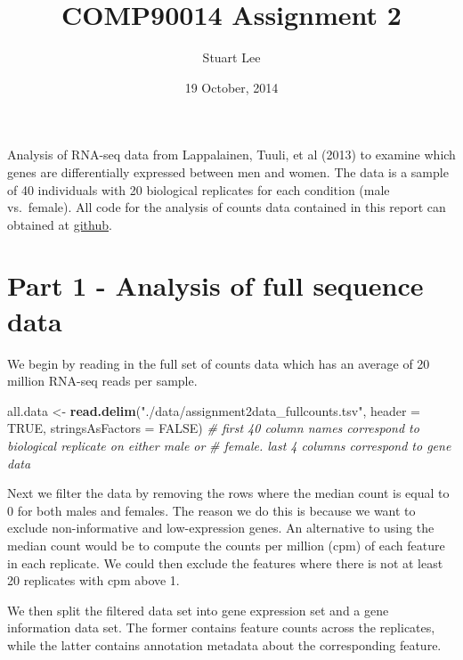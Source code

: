 \documentclass[]{article}
\title{COMP90014 Assignment 2}
\author{Stuart Lee}
\date{19 October, 2014}
\newenvironment{Shaded}{\begin{snugshade}}{\end{snugshade}}
\newcommand{\KeywordTok}[1]{\textcolor[rgb]{0.13,0.29,0.53}{\textbf{{#1}}}}
\newcommand{\DataTypeTok}[1]{\textcolor[rgb]{0.13,0.29,0.53}{{#1}}}
\newcommand{\StringTok}[1]{\textcolor[rgb]{0.31,0.60,0.02}{{#1}}}
\newcommand{\CommentTok}[1]{\textcolor[rgb]{0.56,0.35,0.01}{\textit{{#1}}}}
\newcommand{\OtherTok}[1]{\textcolor[rgb]{0.56,0.35,0.01}{{#1}}}
\newcommand{\NormalTok}[1]{{#1}}
\begin{document}
\maketitle


Analysis of RNA-seq data from Lappalainen, Tuuli, et al (2013) to
examine which genes are differentially expressed between men and women.
The data is a sample of 40 individuals with 20 biological replicates for
each condition (male vs.~female). All code for the analysis of counts
data contained in this report can obtained at
\href{https://github.com/sa-lee/dge-project}{github}.

\section{Part 1 - Analysis of full sequence
data}\label{part-1---analysis-of-full-sequence-data}

We begin by reading in the full set of counts data which has an average
of 20 million RNA-seq reads per sample.

\begin{Shaded}
\begin{Highlighting}[]
\NormalTok{all.data <-}\StringTok{ }\KeywordTok{read.delim}\NormalTok{(}\StringTok{"./data/assignment2data_fullcounts.tsv"}\NormalTok{, }\DataTypeTok{header =} \OtherTok{TRUE}\NormalTok{, }
    \DataTypeTok{stringsAsFactors =} \OtherTok{FALSE}\NormalTok{)}
\CommentTok{# first 40 column names correspond to biological replicate on either male or}
\CommentTok{# female. last 4 columns correspond to gene data}
\end{Highlighting}
\end{Shaded}

Next we filter the data by removing the rows where the median count is
equal to 0 for both males and females. The reason we do this is because
we want to exclude non-informative and low-expression genes. An
alternative to using the median count would be to compute the counts per
million (cpm) of each feature in each replicate. We could then exclude
the features where there is not at least 20 replicates with cpm above 1.

We then split the filtered data set into gene expression set and a gene
information data set. The former contains feature counts across the
replicates, while the latter contains annotation metadata about the
corresponding feature.
\end{document}
